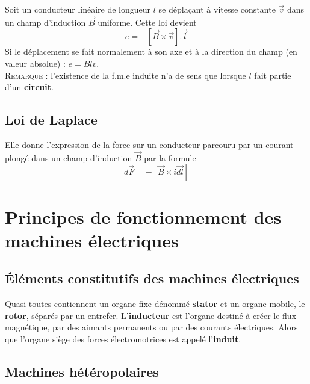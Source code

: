 	Soit un conducteur linéaire de longueur $l$ se 
	déplaçant à vitesse constante $\vec{v}$ dans un champ d'induction $\vec{
	B}$ uniforme. Cette loi devient 
	\begin{equation}
	e = -[\vec{B}\times\vec{v}].\vec{l}
	\label{eq:2.6}
	\end{equation}
	Si le déplacement se fait normalement à son axe et à la direction 
	du champ (en valeur absolue) : $e = Blv$.\\
	\textsc{Remarque :} l'existence de la f.m.e induite n'a de sens que lorsque $l$ fait partie d'un \textbf{circuit}.	\\
	
	\subsection{Loi de Laplace}
	Elle donne l'expression de la force sur un conducteur parcouru par 
	un courant plongé dans un champ d'induction $\vec{B}$ par la formule 
	\begin{equation}
		d\vec{F} = -[\vec{B}\times i\vec{dl}]
	\end{equation}
	
	
\section{Principes de fonctionnement des machines électriques}
	\subsection{Éléments constitutifs des machines électriques}
	Quasi toutes contiennent un organe fixe dénommé \textbf{stator} 
	et un organe mobile, le \textbf{rotor}, séparés par un entrefer. 
	L'\textbf{inducteur} est l'organe destiné à créer le flux 
	magnétique, par des aimants permanents ou par des courants 
	électriques. Alors que l'organe siège des forces électromotrices est appelé l'\textbf{induit}. 
	
	
	\subsection{Machines hétéropolaires}
